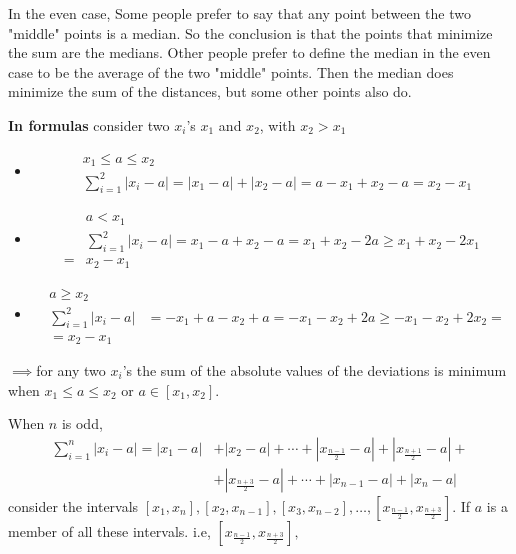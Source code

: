 \documentclass[12pt, letterpaper]{article}
\theoremstyle{definition}
\begin{document}
In the even case, Some people prefer to say that any point between the two "middle" points is a median. So the conclusion is that the points that minimize the sum are the medians. Other people prefer to define the median in the even case to be the average of the two "middle" points. Then the median does minimize the sum of the distances, but some other points also do.

\textbf{In formulas} consider two $x_i$'s $x_1$ and $x_2$, with $x_2>x_1$
\begin{itemize}
\item \begin{equation}\begin{aligned}
&x_1\leq a\leq x_2
\\ &\sum_{i=1}^{2}|x_i-a|=|x_1-a|+|x_2-a|=a-x_1+x_2-a=x_2-x_1
\end{aligned}\end{equation}
\item \begin{equation}\begin{aligned}
&a < x_1
\\&\sum_{i=1}^{2}|x_i-a|=x_1-a+x_2-a=x_1+x_2-2a\ge x_1+x_2-2x_1\\=&x_2-x_1
\end{aligned}\end{equation}
\item \begin{equation}\begin{aligned}
&a\ge x_2
\\&\sum_{i=1}^{2}|x_i-a|&=-x_1+a-x_2+a=-x_1-x_2+2a\ge -x_1-x_2+2x_2=\\
&=x_2 - x_1
\end{aligned}
\end{equation}

\end{itemize}


$\implies$for any two $x_i$'s the sum of the absolute values of the deviations is minimum when $x_1\leq a\leq x_2$ or $a\in[x_1,x_2]$.

When $n$ is odd,
\begin{equation}
\begin{aligned}
\sum_{i=1}^n\left|x_i-a\right|=\left|x_1-a\right|&+\left|x_2-a\right|+\cdots+\left|x_{\tfrac{n-1}{2}}-a\right| + \left|x_{\tfrac{n+1}{2}}-a\right|+\\
&+ \left|x_{\tfrac{n+3}{2}}-a\right|+ \cdots+\left|x_{n-1}-a\right|+\left|x_n-a\right|
\end{aligned}
\end{equation}
consider the intervals $[x_1,x_n], [x_2,x_{n-1}], [x_3,x_{n-2}], \ldots, \left[x_{\tfrac{n-1}{2}}, x_{\tfrac{n+3}{2}}\right]$. If $a$ is a member of all these intervals. i.e, $\left[x_{\tfrac{n-1}{2}},x_{\tfrac{n+3}{2}}\right],$
\end{document}
